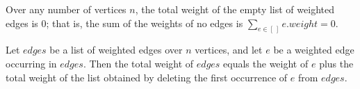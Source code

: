 \begin{lemma}
\label{Kruskal.totalWeight_nil}
\leanok
{}
Over any number of vertices $n$, the total weight of the empty list of weighted edges is
$0$; that is, the sum of the weights of no edges is $\sum_{e \in [\,]} e.\mathit{weight}
= 0$.
\end{lemma}

\begin{lemma}
\label{Kruskal.totalWeight_erase}
\leanok
{}
Let $\mathit{edges}$ be a list of weighted edges over $n$ vertices, and let $e$ be a
weighted edge occurring in $\mathit{edges}$. Then the total weight of $\mathit{edges}$
equals the weight of $e$ plus the total weight of the list obtained by deleting the
first occurrence of $e$ from $\mathit{edges}$.
\end{lemma}

